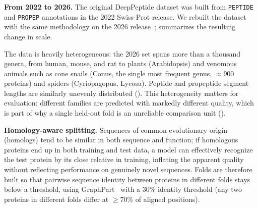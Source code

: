 \documentclass{article}
\begin{document}
\textbf{From 2022 to 2026.} The original DeepPeptide dataset was built from \texttt{PEPTIDE} and \texttt{PROPEP} annotations in the 2022 Swiss-Prot release. We rebuilt the dataset with the same methodology on the 2026 release~\citep{uniprot2025};  summarizes the resulting change in scale.

\begin{table}[h]
\centering
\caption{Dataset composition: 2022 release (as used by the original DeepPeptide) vs.\ the 2026 release rebuilt for this work.}
\label{tab:dataset}
\small
{}
\end{table}

The data is heavily heterogeneous: the 2026 set spans more than a thousand genera, from human, mouse, and rat to plants (Arabidopsis) and venomous animals such as cone snails (Conus, the single most frequent genus, $\approx$900 proteins) and spiders (Cyriopagopus, Lycosa). Peptide and propeptide segment lengths are similarly unevenly distributed (). This heterogeneity matters for evaluation: different families are predicted with markedly different quality, which is part of why a single held-out fold is an unreliable comparison unit ().

\textbf{Homology-aware splitting.} Sequences of common evolutionary origin (homologs) tend to be similar in both sequence and function; if homologous proteins end up in both training and test data, a model can effectively recognize the test protein by its close relative in training, inflating the apparent quality without reflecting performance on genuinely novel sequences. Folds are therefore built so that pairwise sequence identity between proteins in different folds stays below a threshold, using GraphPart~\citep{graphpart2023} with a 30\% identity threshold (any two proteins in different folds differ at $\ge$70\% of aligned positions).
\end{document}
